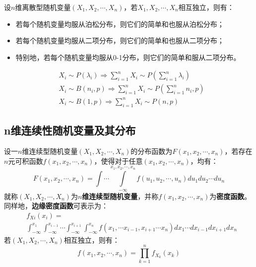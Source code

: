 \begin{theorem}
设$n$维离散型随机变量$\left( X_1,X_2,\cdots ,X_n \right) $，若$X_1,X_2,\cdots ,X_n$相互独立，则有：
\begin{itemize}
    \item 若每个随机变量均服从泊松分布，则它们的简单和也服从泊松分布；
    \item 若每个随机变量均服从二项分布，则它们的简单和也服从二项分布；
    \item 特别地，若每个随机变量均服从0-1分布，则它们的简单和服从二项分布。
\end{itemize}
\begin{align*}
&X_i\sim P\left( \lambda _i \right) \Rightarrow \sum_{i=1}^n{X_i}\sim P\left( \sum_{i=1}^n{\lambda _i} \right) \\
&X_i\sim B\left( n_i,p \right) \Rightarrow \sum_{i=1}^n{X_i}\sim P\left( \sum_{i=1}^n{n_i},p \right) \\
&X_i\sim B\left( 1,p \right) \Rightarrow \sum_{i=1}^n{X_i}\sim P\left( n,p \right)
\end{align*}
\end{theorem}

\subsection{n维连续性随机变量及其分布}

\begin{definition}
设一$n$维连续型随机变量$\left( X_1,X_2,\cdots ,X_n \right) $的分布函数为$F\left( x_1,x_2,\cdots ,x_n \right) $，若存在$n$元可积函数$f\left( x_1,x_2,\cdots ,x_n \right) $，使得对于任意$\left( x_1,x_2,\cdots ,x_n \right) $，均有：
\[
F\left( x_1,x_2,\cdots ,x_n \right) =\int\dotsi\int\limits_{-\infty}^{x_1,x_2,\cdots ,x_n}{f\left( u_1,u_2,\cdots ,u_n \right) du_1du_2\cdots du_n}
\]
就称$\left( X_1,X_2,\cdots ,X_n \right) $为{\bf $n$维连续型随机变量}，并称$f\left( x_1,x_2,\cdots ,x_n \right) $为{\bf 密度函数}。
同样地，{\bf 边缘密度函数}可表示为：
\begin{align*}
&f_{Xi}\left( x_i \right) =\\
&\int_{-\infty}^{x_1}{\int_{-\infty}^{x_{i-1}}{\cdots \int_{-\infty}^{x_{i+1}}{\int_{-\infty}^{x_n}{f\left( x_1,\cdots x_{i-1},x_{i+1}\cdots x_n \right) dx_1\cdots dx_{i-1}dx_{i+1}dx_n}}}}
\end{align*}
若$\left( X_1,X_2,\cdots ,X_n \right) $相互独立，则有：
\[
f\left( x_1,x_2,\cdots ,x_n \right) =\prod_{k=1}^n{f_{X_k}\left( x_k \right)}
\]
\end{definition}

